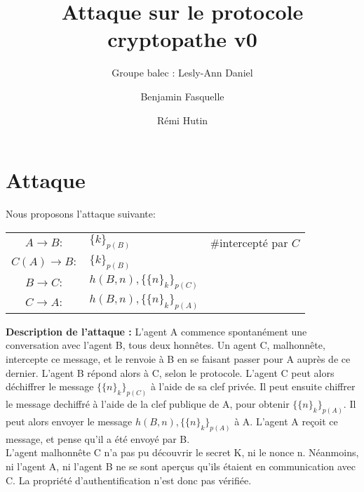 \documentclass[11pt,a4paper]{article}
\author{Groupe balec : Lesly-Ann Daniel \and Benjamin Fasquelle \and Rémi Hutin}
\title{Attaque sur le protocole cryptopathe v0}
\date{}
\begin{document}
\maketitle


\section*{Attaque}

Nous proposons l'attaque suivante:


\begin{table}[!h]
\centering
\begin{tabular}{cll}
$A \rightarrow B:$ & $\{k\}_{p(B)} $ & \#intercepté par $C$  \\
$C(A) \rightarrow B:$ & $\{k\}_{p(B)} $ & \\
$B \rightarrow C:$ & $h(B,n), \{\{n\}_k\}_{p(C)}$ & \\
$C \rightarrow A:$ & $h(B,n), \{\{n\}_k\}_{p(A)}$ & \\
\end{tabular}
\end{table}



\textbf{Description de l'attaque :}
L'agent A commence spontanément une conversation avec l'agent B, tous deux honnêtes.
Un agent C, malhonnête, intercepte ce message, et le renvoie à B en se faisant passer pour A auprès de ce dernier.
L'agent B répond alors à C, selon le protocole.
L'agent C peut alors déchiffrer le message $\{\{n\}_k\}_{p(C)}$ à l'aide de sa clef privée. Il peut ensuite chiffrer le message dechiffré à l'aide de la clef publique de A, pour obtenir $\{\{n\}_k\}_{p(A)}$. Il peut alors envoyer le message $h(B,n), \{\{n\}_k\}_{p(A)}$ à A. 
L'agent A reçoit ce message, et pense qu'il a été envoyé par B. \\

L'agent malhonnête C n'a pas pu découvrir le secret K, ni le nonce n.
Néanmoins, ni l'agent A, ni l'agent B ne se sont aperçus qu'ils étaient en communication avec C. 
La propriété d'authentification n'est donc pas vérifiée.
\end{document}
